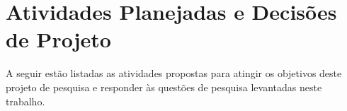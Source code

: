 
\section{Atividades Planejadas e Decisões de Projeto}

A seguir estão listadas as atividades propostas para atingir os objetivos deste projeto de pesquisa e responder às questões de pesquisa levantadas neste trabalho.

